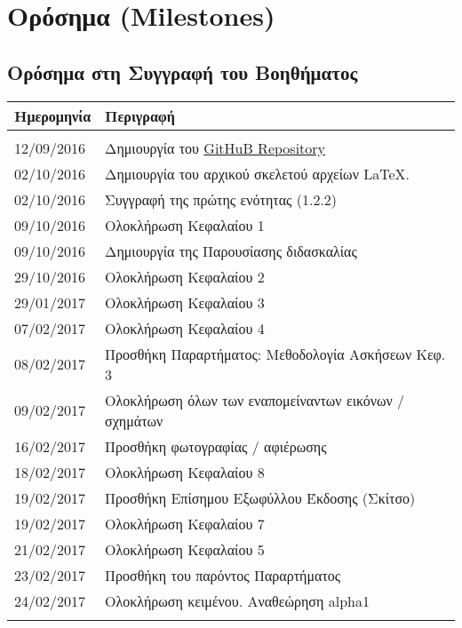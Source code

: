 \chapter{Ορόσημα (Milestones)}
\newpage
\section{Ορόσημα στη Συγγραφή του Βοηθήματος}

\begin{tabular}{ll}
\textbf{Ημερομηνία} & \textbf{Περιγραφή} \\
\hline\\
 12/09/2016 & Δημιουργία του \href{https://github.com/sonic2000gr/diktia}{GitHuB Repository}\\ 
 02/10/2016 & Δημιουργία του αρχικού σκελετού αρχείων \LaTeX.\\
 02/10/2016 & Συγγραφή της πρώτης ενότητας (1.2.2)\\
 09/10/2016 & Ολοκλήρωση Κεφαλαίου 1\\
 09/10/2016 & Δημιουργία της Παρουσίασης διδασκαλίας\\
 29/10/2016 & Ολοκλήρωση Κεφαλαίου 2\\
 29/01/2017 & Ολοκλήρωση Κεφαλαίου 3\\
 07/02/2017 & Ολοκλήρωση Κεφαλαίου 4\\
 08/02/2017 & Προσθήκη Παραρτήματος: Μεθοδολογία Ασκήσεων Κεφ. 3\\
 09/02/2017 & Ολοκλήρωση όλων των εναπομείναντων εικόνων / σχημάτων\\
 16/02/2017 & Προσθήκη φωτογραφίας / αφιέρωσης\\
 18/02/2017 & Ολοκλήρωση Κεφαλαίου 8\\
 19/02/2017 & Προσθήκη Επίσημου Εξωφύλλου Έκδοσης (Σκίτσο)\\
 19/02/2017 & Ολοκλήρωση Κεφαλαίου 7\\
 21/02/2017 & Ολοκλήρωση Κεφαλαίου 5\\
 23/02/2017 & Προσθήκη του παρόντος Παραρτήματος\\
 24/02/2017 & Ολοκλήρωση κειμένου. Αναθεώρηση alpha1\\\\
\hline
\end{tabular}
